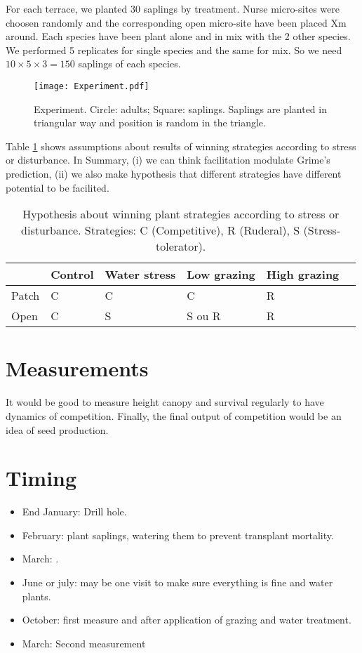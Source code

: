 \documentclass[12pt]{article} %
\begin{document}
For each terrace, we planted 30 saplings by treatment. Nurse micro-sites were choosen randomly and the corresponding open micro-site have been placed Xm around. Each species have been plant alone and in mix with the 2 other species. We performed  5 replicates for single species and the same for mix. So we need $10\times5\times3=150$ saplings of each species.


\begin{figure}
\begin{center}
\texttt{[image: Experiment.pdf]}
\end{center}
\caption{Experiment. Circle: adults; Square: saplings. Saplings are planted in triangular way and position is random in the triangle. \label{exp}}
\end{figure}

Table \ref{hyp} shows assumptions about results of winning strategies according to stress or disturbance. In Summary, (i) we can think facilitation modulate Grime's prediction, (ii) we also make hypothesis that different strategies have different potential to be facilited.


\begin{table}
\begin{center}
\begin{tabular}{|l|l|l|l|l|l|}
  \hline
  & Control & Water stress & Low grazing & High grazing  \\
  \hline
  Patch & C & C & C & R \\
  \hline
  Open & C & S & S ou R & R \\
  \hline
\end{tabular} 
\end{center}
\caption{Hypothesis about winning plant strategies according to stress or disturbance.  Strategies: C (Competitive), R (Ruderal), S (Stress-tolerator). \label{hyp}}
\end{table}

\section{Measurements}
It would be good to measure height canopy and survival regularly to have dynamics of competition. Finally, the final output of competition would be an idea of seed production.


\section{Timing}
\begin{itemize}

\item End January: Drill hole.
\item February: plant saplings, watering them to prevent transplant mortality.
\item March: .
\item June or july: may be one visit to make sure everything is fine and water plants.
\item October: first measure and after application of grazing and water treatment.
\item March: Second measurement

\end{itemize}

%

%
\printbibliography
\end{document}
